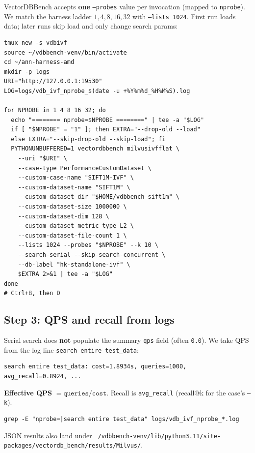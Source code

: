 \documentclass[11pt,a4paper]{article}
\begin{document}
VectorDBBench accepts \textbf{one} \texttt{--probes} value per invocation (mapped to
\texttt{nprobe}). We match the harness ladder $1,4,8,16,32$ with \texttt{--lists 1024}.
First run loads data; later runs skip load and only change search params:

\begin{verbatim}
tmux new -s vdbivf
source ~/vdbbench-venv/bin/activate
cd ~/ann-harness-amd
mkdir -p logs
URI="http://127.0.0.1:19530"
LOG=logs/vdb_ivf_nprobe_$(date -u +%Y%m%d_%H%M%S).log

for NPROBE in 1 4 8 16 32; do
  echo "======== nprobe=$NPROBE ========" | tee -a "$LOG"
  if [ "$NPROBE" = "1" ]; then EXTRA="--drop-old --load"
  else EXTRA="--skip-drop-old --skip-load"; fi
  PYTHONUNBUFFERED=1 vectordbbench milvusivfflat \
    --uri "$URI" \
    --case-type PerformanceCustomDataset \
    --custom-case-name "SIFT1M-IVF" \
    --custom-dataset-name "SIFT1M" \
    --custom-dataset-dir "$HOME/vdbbench-sift1m" \
    --custom-dataset-size 1000000 \
    --custom-dataset-dim 128 \
    --custom-dataset-metric-type L2 \
    --custom-dataset-file-count 1 \
    --lists 1024 --probes "$NPROBE" --k 10 \
    --search-serial --skip-search-concurrent \
    --db-label "hk-standalone-ivf" \
    $EXTRA 2>&1 | tee -a "$LOG"
done
# Ctrl+B, then D
\end{verbatim}

\subsection{Step 3: QPS and recall from logs}

Serial search does \textbf{not} populate the summary \texttt{qps} field (often \texttt{0.0}).
We take QPS from the log line \texttt{search entire test\_data}:

\begin{verbatim}
search entire test_data: cost=1.8934s, queries=1000, avg_recall=0.8924, ...
\end{verbatim}

\textbf{Effective QPS} $= \texttt{queries} / \texttt{cost}$. Recall is \texttt{avg\_recall}
(recall@k for the case's \texttt{--k}).

\begin{verbatim}
grep -E "nprobe=|search entire test_data" logs/vdb_ivf_nprobe_*.log
\end{verbatim}

JSON results also land under
\texttt{~/vdbbench-venv/lib/python3.11/site-packages/vectordb\_bench/results/Milvus/}.
\end{document}
